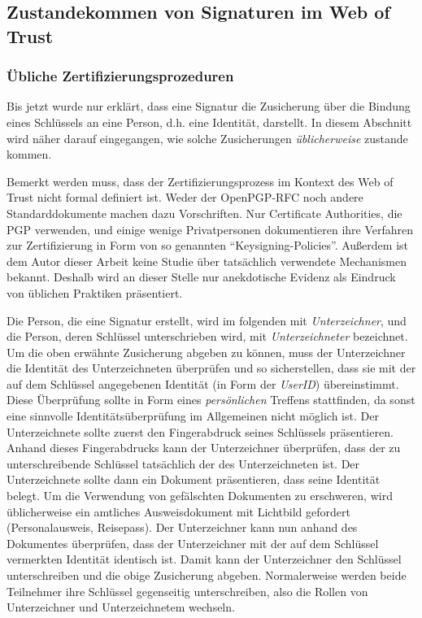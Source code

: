 \subsection{Zustandekommen von Signaturen im Web of Trust}
\label{sec:sozi-komp-des}

\subsubsection{Übliche Zertifizierungsprozeduren}
\label{sec:ubliche-zert}

Bis jetzt wurde nur erklärt, dass eine Signatur die
Zusicherung über die Bindung eines Schlüssels an eine Person,
d.h. eine Identität, darstellt. In diesem Abschnitt wird näher
darauf eingegangen, wie solche Zusicherungen \emph{üblicherweise}
zustande kommen.

Bemerkt werden muss, dass der Zertifizierungsprozess im Kontext des
Web of Trust nicht formal definiert ist. Weder der OpenPGP-RFC noch
andere Standarddokumente machen dazu Vorschriften. Nur Certificate
Authorities, die PGP verwenden, und einige wenige Privatpersonen
dokumentieren ihre Verfahren zur Zertifizierung in Form von
so genannten ``Keysigning-Policies''. Außerdem ist dem Autor dieser
Arbeit keine Studie über tatsächlich verwendete Mechanismen
bekannt. Deshalb wird an dieser Stelle nur anekdotische Evidenz
als Eindruck von üblichen Praktiken präsentiert.

Die Person, die eine Signatur erstellt, wird im folgenden mit
\emph{Unterzeichner}, und die Person, deren Schlüssel
unterschrieben wird, mit \emph{Unterzeichneter} bezeichnet. Um
die oben erwähnte Zusicherung abgeben zu können, muss der
Unterzeichner die Identität des Unterzeichneten überprüfen und
so sicherstellen, dass sie mit der auf dem Schlüssel angegebenen
Identität (in Form der \emph{UserID}) übereinstimmt. Diese
Überprüfung sollte in Form eines \emph{persönlichen} Treffens
stattfinden, da sonst eine sinnvolle Identitätsüberprüfung im
Allgemeinen nicht möglich ist. Der Unterzeichnete sollte zuerst den
Fingerabdruck seines Schlüssels präsentieren. Anhand dieses
Fingerabdrucks kann der Unterzeichner überprüfen, dass der zu
unterschreibende Schlüssel tatsächlich der des Unterzeichneten
ist.  Der Unterzeichnete sollte dann ein Dokument präsentieren, dass
seine Identität belegt. Um die Verwendung von gefälschten
Dokumenten zu erschweren, wird üblicherweise ein amtliches
Ausweisdokument mit Lichtbild gefordert (Personalausweis,
Reisepass). Der Unterzeichner kann nun anhand des Dokumentes
überprüfen, dass der Unterzeichner mit der auf dem Schlüssel
vermerkten Identität identisch ist. Damit kann der Unterzeichner den
Schlüssel unterschreiben und die obige Zusicherung
abgeben. Normalerweise werden beide Teilnehmer ihre Schlüssel
gegenseitig unterschreiben, also die Rollen von Unterzeichner und
Unterzeichnetem wechseln.

